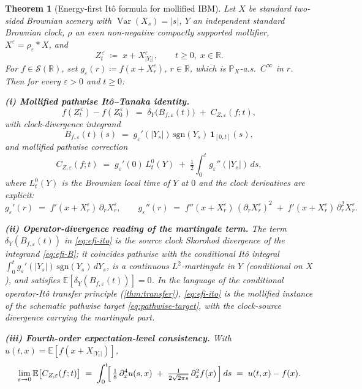 \documentclass[11pt,reqno]{amsart}
\theoremstyle{plain}
\newtheorem{theorem}{Theorem}[section]
\theoremstyle{definition}
\theoremstyle{remark}
\newcommand{\R}{\mathbb{R}}
\newcommand{\E}{\mathbb{E}}
\newcommand{\Prob}{\mathbb{P}}
\newcommand{\IBM}{Z}
\DeclareMathOperator{\Var}{Var}
\begin{document}
\begin{theorem}[Energy-first It\^o formula for mollified IBM]
\label{thm:energy-first-ito-moll}
Let $X$ be standard two-sided Brownian scenery with $\Var(X_s)=|s|$,
$Y$ an independent standard Brownian clock, $\rho$ an even
non-negative compactly supported mollifier, $X^\varepsilon=
\rho_\varepsilon*X$, and
\[
  \IBM_t^{\,\varepsilon}\;\coloneqq\;x+X^\varepsilon_{|Y_t|},
  \qquad t\ge 0,\;x\in\R.
\]
For $f\in\mathscr S(\R)$, set $g_\varepsilon(r)\coloneqq
f(x+X^\varepsilon_r)$, $r\in\R$, which is $\Prob_X$-a.s.\ $C^\infty$
in $r$. Then for every $\varepsilon>0$ and $t\ge 0$:

\smallskip
\noindent\textbf{(i) Mollified pathwise It\^o--Tanaka identity.}
\begin{equation}\label{eq:efi-ito}
  f(\IBM_t^{\,\varepsilon})-f(\IBM_0^{\,\varepsilon})
  \;=\;\delta_Y\bigl(B_{f,\varepsilon}(t)\bigr)
   \;+\;C_{\IBM,\varepsilon}(f;t),
\end{equation}
with clock-divergence integrand
\begin{equation}\label{eq:efi-B}
  B_{f,\varepsilon}(t)(s)
   \;=\;g_\varepsilon'(|Y_s|)\,\mathrm{sgn}(Y_s)\,
        \mathbf 1_{[0,t]}(s),
\end{equation}
and mollified pathwise correction
\begin{equation}\label{eq:efi-C}
  C_{\IBM,\varepsilon}(f;t)
   \;=\;g_\varepsilon'(0)\,L_t^{0}(Y)
   \;+\;\tfrac12\!\int_0^t g_\varepsilon''(|Y_s|)\,ds,
\end{equation}
where $L_t^{0}(Y)$ is the Brownian local time of $Y$ at $0$ and the
clock derivatives are explicit:
\begin{equation}\label{eq:efi-gpp}
  g_\varepsilon'(r)
   \;=\;f'(x+X^\varepsilon_r)\,\partial_rX^\varepsilon_r,\qquad
  g_\varepsilon''(r)
   \;=\;f''(x+X^\varepsilon_r)\,(\partial_rX^\varepsilon_r)^{2}
   \;+\;f'(x+X^\varepsilon_r)\,\partial_r^{2}X^\varepsilon_r.
\end{equation}

\smallskip
\noindent\textbf{(ii) Operator-divergence reading of the martingale
term.} The term $\delta_Y(B_{f,\varepsilon}(t))$ in \eqref{eq:efi-ito}
is the source clock Skorohod divergence of the integrand
\eqref{eq:efi-B}; it coincides pathwise with the conditional It\^o
integral $\int_0^t g_\varepsilon'(|Y_s|)\,\mathrm{sgn}(Y_s)\,dY_s$, is
a continuous $L^{2}$-martingale in $Y$ (conditional on $X$), and
satisfies $\E[\delta_Y(B_{f,\varepsilon}(t))]=0$. In the language of
the conditional operator-It\^o transfer principle
(\cref{thm:transfer}), \eqref{eq:efi-ito} is the mollified instance
of the schematic pathwise target \eqref{eq:pathwise-target}, with the
clock-source divergence carrying the martingale part.

\smallskip
\noindent\textbf{(iii) Fourth-order expectation-level consistency.}
With $u(t,x)=\E[f(x+X_{|Y_t|})]$,
\begin{equation}\label{eq:efi-fourth}
  \lim_{\varepsilon\to 0}\E\bigl[C_{\IBM,\varepsilon}(f;t)\bigr]
   \;=\;\int_0^t\!\Bigl[\,\tfrac{1}{8}\,\partial_x^{4}u(s,x)
        \;+\;\tfrac{1}{2\sqrt{2\pi s}}\,\partial_x^{2}f(x)\,\Bigr]\,ds
   \;=\;u(t,x)-f(x).
\end{equation}
\end{theorem}
\end{document}

